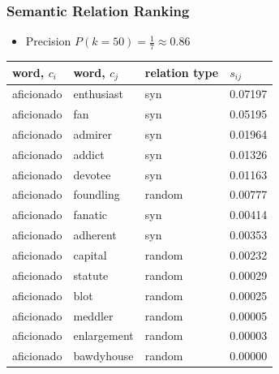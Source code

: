 \begin{frame}
\frametitle{Semantic Relation Ranking}

\begin{itemize}
   \item Precision $P(k=50)= \frac{1}{7} \approx 0.86 $
\end{itemize}


\begin{table}[h]\footnotesize
\begin{tabular}{ |l|l|l|l| }
\hline
\bf word, $c_i$ & \bf  word, $c_j$ & \bf relation type & \bf $s_{ij}$ \\ \hline \hline

aficionado & enthusiast & syn & 0.07197 \\
aficionado & fan & syn & 0.05195 \\
aficionado & admirer & syn & 0.01964 \\
aficionado & addict & syn & 0.01326 \\
aficionado & devotee & syn & 0.01163 \\
\alert{aficionado} & \alert{foundling} & \alert{random} & \alert{0.00777} \\
aficionado & fanatic & syn & 0.00414 \\ \hline
aficionado & adherent & syn & 0.00353 \\
aficionado & capital & random & 0.00232 \\
aficionado & statute & random & 0.00029 \\
aficionado & blot & random & 0.00025 \\
aficionado & meddler & random & 0.00005 \\
aficionado & enlargement & random & 0.00003 \\
aficionado & bawdyhouse & random &  0.00000 \\ 
\hline
\end{tabular}
\end {table}

\end{frame}


